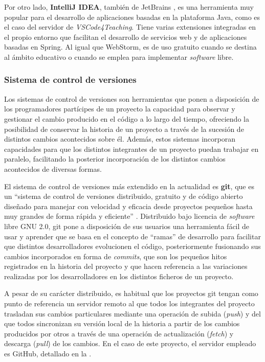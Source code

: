 Por otro lado, \textbf{IntelliJ IDEA}, también de JetBrains \cite{IntelliJ}, es una herramienta muy popular para el desarrollo de aplicaciones basadas en la plataforma Java, como es el caso del servidor de \textit{VSCode4Teaching}. Tiene varias extensiones integradas en el propio entorno que facilitan el desarrollo de servicios web y de aplicaciones basadas en Spring. Al igual que WebStorm, es de uso gratuito cuando se destina al ámbito educativo o cuando se emplea para implementar \textit{software} libre.

\subsubsection{Sistema de control de versiones}
\label{subsec:herGit}
Los sistemas de control de versiones son herramientas que ponen a disposición de los programadores partícipes de un proyecto la capacidad para observar y gestionar el cambio producido en el código a lo largo del tiempo, ofreciendo la posibilidad de conservar la historia de un proyecto a través de la sucesión de distintos cambios acontecidos sobre él. Además, estos sistemas incorporan capacidades para que los distintos integrantes de un proyecto puedan trabajar en paralelo, facilitando la posterior incorporación de los distintos cambios acontecidos de diversas formas.

El sistema de control de versiones más extendido en la actualidad es \textbf{git}, que es un ``sistema de control de versiones distribuido, gratuito y de código abierto diseñado para manejar con velocidad y eficacia desde proyectos pequeños hasta muy grandes de forma rápida y eficiente'' \cite{Git}. Distribuido bajo licencia de \textit{software} libre GNU 2.0, git pone a disposición de sus usuarios una herramienta fácil de usar y aprender que se basa en el concepto de ``ramas'' de desarrollo para facilitar que distintos desarrolladores evolucionen el código, posteriormente fusionando sus cambios incorporados en forma de \textit{commits}, que son los pequeños hitos registrados en la historia del proyecto y que hacen referencia a las variaciones realizadas por los desarrolladores en los distintos ficheros de un proyecto.

A pesar de su carácter distribuido, es habitual que los proyectos git tengan como punto de referencia un servidor remoto al que todos los integrantes del proyecto trasladan sus cambios particulares mediante una operación de subida (\textit{push}) y del que todos sincronizan su versión local de la historia a partir de los cambios producidos por otros a través de una operación de actualización (\textit{fetch}) y descarga (\textit{pull}) de los cambios. En el caso de este proyecto, el servidor empleado es GitHub, detallado en la .

